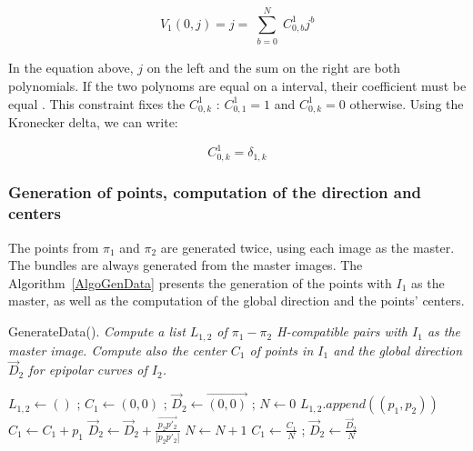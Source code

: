 \documentclass{ipol}
\newcommand{\PiVert}{\widetilde{\pi}}
\begin{document}
\begin{equation}
    V_1(0,j) =  j =   \sum\limits_{\substack{b=0}}^{N}  C^1_{0,b}  j^b  \label{CstrV1:0}
\end{equation}

In the equation above, $j$ on the left and the  sum on the right are both polynomials. If the two polynoms are equal on a interval, their coefficient must be equal . This constraint fixes the $C^1_{0,k}$ : $C^1_{0,1}=1$ and $C^1_{0,k}=0$ otherwise.
Using the Kronecker delta, we can write:

\begin{equation}
         C^1_{0,k} = \delta_{1,k} \label{CstrV1:1}
\end{equation}

\subsubsection{Generation of points, computation of the direction and centers}

The  points from $\pi_1$ and $\pi_2$ are generated twice, using each image as the master. The bundles are always generated from the  master images. The Algorithm~\ref{AlgoGenData} presents the 
generation of the points with $I_1$  as the master, as well as the computation of the global direction and the points' centers.

\begin{algorithm}[H]
\caption{GenerateData(). \emph{Compute a list $L_{1,2}$  of   $\pi_1-\pi_2$ H-compatible pairs with $I_1$ as the master image.
 Compute also the center $C_1$ of points in $I_1$  and the global direction $\vec{D}_2$ for epipolar curves of $I_2$.}}
\begin{algorithmic}
    \STATE $L_{1,2}\gets () $ ;  $C_1 \gets (0,0)$  ;   $\vec{D}_2 \gets  \overrightarrow{(0,0)}$ ; $N \gets 0 $
                  \STATE {$p_2 = \pi_2(\PiVert^{-1}_1(p_1,Z))$}
                  \STATE {$p'_2 = \pi_2(\PiVert^{-1}_1(p_1,Z+\delta_{z}))$}
                       \STATE $L_{1,2}.append((p_1,p_2))$  
                       \STATE $C_1 \gets C_1 + p_1$
                       \STATE $\vec{D}_2 \gets  \vec{D}_2 + \frac{\overrightarrow{p_2 p'_2}}{|p_2 p'_2|}$
                       \STATE $N \gets  N +1 $
                  \ENDIF
             \ENDFOR
        \ENDFOR
    \ENDFOR
    $C_1 \gets \frac{C_1}{N}$  ; $\vec{D}_2 \gets \frac{\vec{D}_2}{N} $
\end{algorithmic}
\label{AlgoGenData}
\end{algorithm}
\end{document}
